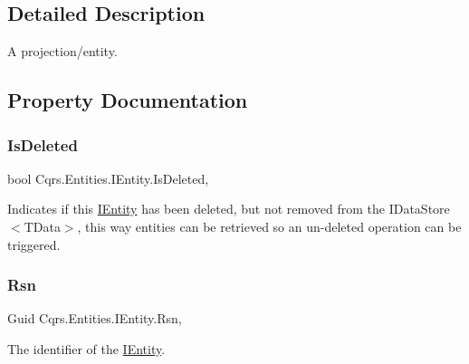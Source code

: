 \subsection{Detailed Description}
A projection/entity. 



\subsection{Property Documentation}
\mbox{\label{interfaceCqrs_1_1Entities_1_1IEntity_a00ec967f1f8e6c32ae7d4ecc9d3a8e08_a00ec967f1f8e6c32ae7d4ecc9d3a8e08}} 
\subsubsection{\texorpdfstring{Is\+Deleted}{IsDeleted}}
{\footnotesize\ttfamily bool Cqrs.\+Entities.\+I\+Entity.\+Is\+Deleted\hspace{0.3cm}{\ttfamily [get]}, {\ttfamily [set]}}



Indicates if this \hyperlink{interfaceCqrs_1_1Entities_1_1IEntity}{I\+Entity} has been deleted, but not removed from the I\+Data\+Store$<$\+T\+Data$>$, this way entities can be retrieved so an un-\/deleted operation can be triggered. 

\mbox{\label{interfaceCqrs_1_1Entities_1_1IEntity_af2bfc288bc574712d7f00af608789f8d_af2bfc288bc574712d7f00af608789f8d}} 
\subsubsection{\texorpdfstring{Rsn}{Rsn}}
{\footnotesize\ttfamily Guid Cqrs.\+Entities.\+I\+Entity.\+Rsn\hspace{0.3cm}{\ttfamily [get]}, {\ttfamily [set]}}



The identifier of the \hyperlink{interfaceCqrs_1_1Entities_1_1IEntity}{I\+Entity}. 

